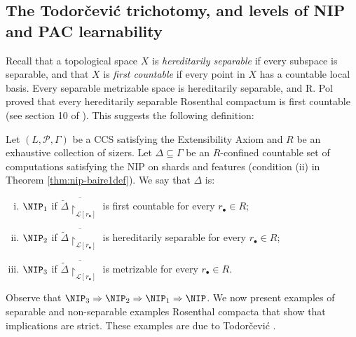 \subsection{The Todorčević trichotomy, and levels of NIP and PAC learnability}\label{sec:trichotomy}
Recall that a topological space $X$ is \emph{hereditarily separable} if every subspace is separable, and that $X$ is \emph{first countable} if every point in $X$ has a countable local basis.
Every separable metrizable space is hereditarily separable, and R.
Pol proved that every hereditarily separable Rosenthal compactum is first countable (see section 10 of \cite{debs2013rosenthal}).
This suggests the following definition:

\begin{definition}
    Let $(L,\mathcal{P},\Gamma)$ be a CCS satisfying the Extensibility Axiom and $R$ be an exhaustive collection of sizers.
Let $\Delta\subseteq\Gamma$ be an $R$-confined countable set of computations satisfying the NIP on shards and features (condition (ii) in Theorem \ref{thm:nip-baire1def}).
We say that $\Delta$ is:
    \begin{enumerate}[(i)]
        \item
        $\NIP_1$ if $\overline{\tilde\Delta\restriction_{\mathcal{L}[r_\bullet]}}$ is first countable for every $r_\bullet\in R$;
        \item
        $\NIP_2$ if $\overline{\tilde\Delta\restriction_{\mathcal{L}[r_\bullet]}}$ is hereditarily separable for every $r_\bullet\in R$;
        \item
        $\NIP_3$ if $\overline{\tilde\Delta\restriction_{\mathcal{L}[r_\bullet]}}$ is metrizable for every $r_\bullet\in R$.
    \end{enumerate}
\end{definition}

Observe that $\NIP_3 \Rightarrow \NIP_2\Rightarrow \NIP_1\Rightarrow \NIP$.
We now present examples of separable and non-separable examples Rosenthal compacta that show that implications are strict.
These examples are due to Todorčević \cite{Todorcevic_1999_CompactSubsetsBaire}.

